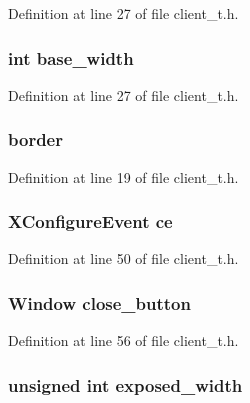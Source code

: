 Definition at line 27 of file client\_\-t.h.

\hypertarget{struct_client_aa0b13e3f79d38a4b7237ab675747fa38}{
\subsubsection[{base\_\-width}]{\setlength{\rightskip}{0pt plus 5cm}int {\bf base\_\-width}}}
\label{struct_client_aa0b13e3f79d38a4b7237ab675747fa38}


Definition at line 27 of file client\_\-t.h.

\hypertarget{struct_client_ac02762c61f637035a296399efe9c753f}{
\subsubsection[{border}]{ {\bf border}}}
\label{struct_client_ac02762c61f637035a296399efe9c753f}


Definition at line 19 of file client\_\-t.h.

\hypertarget{struct_client_ae0ec354a175554aba466bf324c8dd491}{
\subsubsection[{ce}]{\setlength{\rightskip}{0pt plus 5cm}XConfigureEvent {\bf ce}}}
\label{struct_client_ae0ec354a175554aba466bf324c8dd491}


Definition at line 50 of file client\_\-t.h.

\hypertarget{struct_client_a821bbd825717f458f5aaa2f05268eb4d}{
\subsubsection[{close\_\-button}]{\setlength{\rightskip}{0pt plus 5cm}Window {\bf close\_\-button}}}
\label{struct_client_a821bbd825717f458f5aaa2f05268eb4d}


Definition at line 56 of file client\_\-t.h.

\hypertarget{struct_client_ac1076486ffbe5bc491c0de86c500b5f1}{
\subsubsection[{exposed\_\-width}]{\setlength{\rightskip}{0pt plus 5cm}unsigned int {\bf exposed\_\-width}}}
\label{struct_client_ac1076486ffbe5bc491c0de86c500b5f1}


